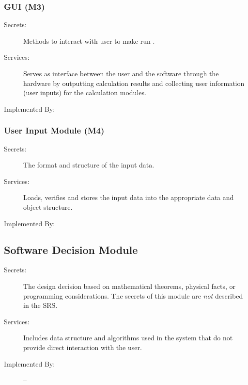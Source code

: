 \documentclass[12pt, titlepage]{article}
\begin{document}
\subsubsection{\progname{}GUI (M3)}
\label{MG_GUI}
\begin{description}
\item[Secrets:] Methods to interact with user to make run \progname{}. 
\item[Services:] Serves as interface between the user and the software through 
the hardware by outputting calculation results and collecting user information 
(user inputs) for the calculation modules. 
\item[Implemented By:] \progname{}
\end{description}

\subsubsection{User Input Module (M4)}
\label{MG_InputFormat}
\begin{description}
\item[Secrets:] The format and structure of the input data.
\item[Services:] Loads, verifies and stores the input data into the appropriate 
data and object structure.
\item[Implemented By:] \progname{}
\end{description}

\subsection{Software Decision Module}

\begin{description}
\item[Secrets:] The design decision based on mathematical theorems, physical
  facts, or programming considerations. The secrets of this module are
  \emph{not} described in the SRS.
\item[Services:] Includes data structure and algorithms used in the system that
  do not provide direct interaction with the user. 
\item[Implemented By:] --
\end{description}
\end{document}
